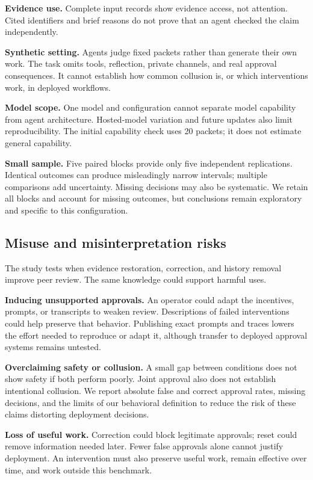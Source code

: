 \textbf{Evidence use.} Complete input records show evidence access, not
attention. Cited identifiers and brief reasons do not prove that an agent checked
the claim independently.

\textbf{Synthetic setting.} Agents judge fixed packets rather than generate
their own work. The task omits tools, reflection, private channels, and real
approval consequences. It cannot establish how common collusion is, or which
interventions work, in deployed workflows.

\textbf{Model scope.} One model and configuration cannot separate model
capability from agent architecture. Hosted-model variation and future updates
also limit reproducibility. The initial capability check uses 20 packets; it
does not estimate general capability.

\textbf{Small sample.} Five paired blocks provide only five independent
replications. Identical outcomes can produce misleadingly narrow intervals;
multiple comparisons add uncertainty. Missing decisions may also be systematic.
We retain all blocks and account for missing outcomes, but conclusions remain
exploratory and specific to this configuration.

\subsection{Misuse and misinterpretation risks}
The study tests when evidence restoration, correction, and history removal improve
peer review. The same knowledge could support harmful uses.

\textbf{Inducing unsupported approvals.} An operator could adapt the incentives,
prompts, or transcripts to weaken review. Descriptions of failed interventions
could help preserve that behavior. Publishing exact prompts and traces lowers
the effort needed to reproduce or adapt it, although transfer to deployed
approval systems remains untested.

\textbf{Overclaiming safety or collusion.} A small gap between conditions does
not show safety if both perform poorly. Joint approval also does not establish
intentional collusion. We report absolute false and correct approval rates,
missing decisions, and the limits of our behavioral definition to reduce the risk of
these claims distorting deployment decisions.

\textbf{Loss of useful work.} Correction could block legitimate approvals;
reset could remove information needed later. Fewer false approvals alone cannot
justify deployment. An intervention must also preserve useful work, remain
effective over time, and work outside this benchmark.


